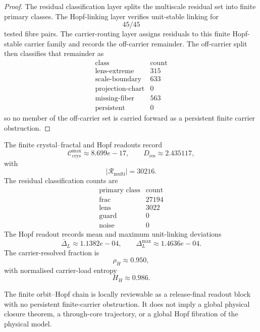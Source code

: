 \begin{proof}
The residual classification layer splits the multiscale residual set into
finite primary classes.  The Hopf-linking layer verifies unit-stable linking for
\[
    45/45
\]
tested fibre pairs.  The carrier-routing layer assigns residuals to this finite
Hopf-stable carrier family and records the off-carrier remainder.  The
off-carrier split then classifies that remainder as
\[
\begin{array}{c|r}
\text{class} & \text{count}\\
\hline
\mathrm{lens\text{-}extreme} & 315\\
\mathrm{scale\text{-}boundary} & 633\\
\mathrm{projection\text{-}chart} & 0\\
\mathrm{missing\text{-}fiber} & 563\\
\mathrm{persistent} & 0
\end{array}
\]
so no member of the off-carrier set is carried forward as a persistent finite
carrier obstruction.
\end{proof}

\begin{remark}
\label{rem:numerical-readout-summary}
The finite crystal--fractal and Hopf readouts record
\[
    \mathcal C_{\mathrm{crys}}^{\max}\approx 8.699e-17,
    \qquad
    D_{\mathrm{res}}\approx 2.435117,
\]
with
\[
    |\mathcal R_{\mathrm{multi}}|=30216.
\]
The residual classification counts are
\[
\begin{array}{c|r}
\text{primary class} & \text{count}\\
\hline
\mathrm{frac} & 27194\\
\mathrm{lens} & 3022\\
\mathrm{guard} & 0\\
\mathrm{noise} & 0
\end{array}
\]
The Hopf readout records mean and maximum unit-linking deviations
\[
    \overline{\Delta}_L\approx 1.1382e-04,
    \qquad
    \Delta_L^{\max}\approx 1.4636e-04.
\]
The carrier-resolved fraction is
\[
    \rho_H\approx 0.950,
\]
with normalised carrier-load entropy
\[
    H_H\approx 0.986.
\]
\end{remark}

\begin{theorem}
\label{thm:release-final-guard}
The finite orbit--Hopf chain is locally reviewable as a release-final
readout block with no persistent finite-carrier obstruction.  It does not imply
a global physical closure theorem, a through-core trajectory, or a global Hopf
fibration of the physical model.
\end{theorem}

